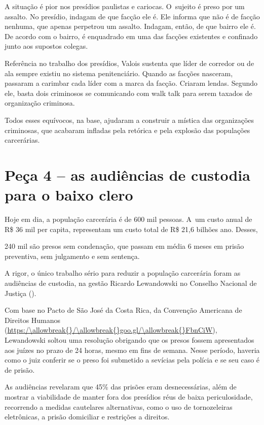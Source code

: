 A situação é pior nos presídios paulistas e cariocas. O~sujeito é preso
por um assalto. No presídio, indagam de que facção ele é. Ele informa
que não é de facção nenhuma, que apenas perpetrou um assalto. Indagam,
então, de que bairro ele é. De acordo com o bairro, é enquadrado em uma
das facções existentes e confinado junto aos supostos colegas.

Referência no trabalho dos presídios, Valois sustenta que líder de
corredor ou de ala sempre existiu no sistema penitenciário. Quando as
facções nasceram, passaram a carimbar cada líder com a marca da facção.
Criaram lendas. Segundo ele, basta dois criminosos se comunicando com
walk talk para serem taxados de organização criminosa.

Todos esses equívocos, na base, ajudaram a construir a mística das
organizações criminosas, que acabaram infladas pela retórica e pela
explosão das populações carcerárias.

\section{Peça 4 -- as audiências de custodia para o baixo clero}

Hoje em dia, a população carcerária é de 600 mil pessoas. A~um custo
anual de R\$ 36 mil per capita, representam um custo total de R\$ 21,6
bilhões ano. Desses,

240 mil são presos sem condenação, que passam em média 6 meses em prisão
preventiva, sem julgamento e sem sentença.

A rigor, o único trabalho sério para reduzir a população carcerária
foram as audiências de custodia, na gestão Ricardo Lewandowski no
Conselho Nacional de Justiça ().

Com base no Pacto de São José da Costa Rica, da Convenção Americana de
Direitos Humanos (\url{https:/\allowbreak{}/\allowbreak{}goo.gl/\allowbreak{}FbnCiW}), Lewandowski soltou uma
resolução obrigando que os presos fossem apresentados aos juízes no
prazo de 24 horas, mesmo em fins de semana. Nesse período, haveria como
o juiz conferir se o preso foi submetido a sevícias pela polícia e se
seu caso é de prisão.

As audiências revelaram que 45\% das prisões eram desnecessárias, além
de mostrar a viabilidade de manter fora dos presídios réus de baixa
periculosidade, recorrendo a medidas cautelares alternativas, como o uso
de tornozeleiras eletrônicas, a prisão domiciliar e restrições a
direitos.

